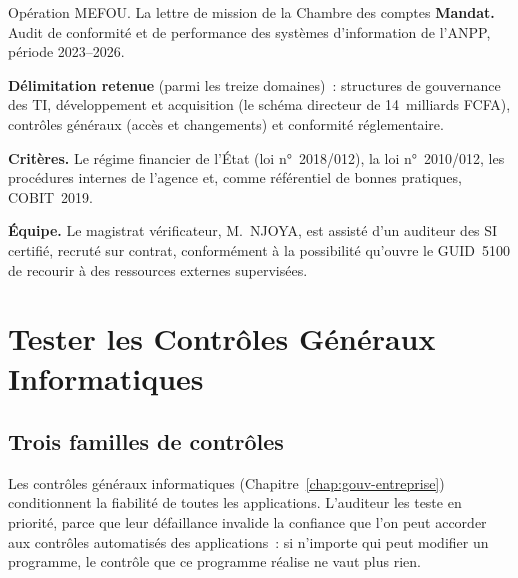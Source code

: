 \begin{boxscenario}{Opération MEFOU. La lettre de mission de la Chambre des comptes}
\textbf{Mandat.} Audit de conformité et de performance des systèmes
d'information de l'ANPP, période 2023--2026.

\medskip
\textbf{Délimitation retenue} (parmi les treize domaines)~: structures de
gouvernance des TI, développement et acquisition (le schéma directeur de
14~milliards FCFA), contrôles généraux (accès et changements) et
conformité réglementaire.

\medskip
\textbf{Critères.} Le régime financier de l'État (loi n°~2018/012), la loi
n°~2010/012, les procédures internes de l'agence et, comme référentiel de
bonnes pratiques, COBIT~2019.

\medskip
\textbf{Équipe.} Le magistrat vérificateur, M.~NJOYA, est assisté d'un
auditeur des SI certifié, recruté sur contrat, conformément à la
possibilité qu'ouvre le GUID~5100 de recourir à des ressources externes
supervisées.
\end{boxscenario}

\section{Tester les Contrôles Généraux Informatiques}
\label{sec:c11-itgc}

\subsection{Trois familles de contrôles}

Les contrôles généraux informatiques (Chapitre~\ref{chap:gouv-entreprise})
conditionnent la fiabilité de toutes les applications. L'auditeur les
teste en priorité, parce que leur défaillance invalide la confiance que
l'on peut accorder aux contrôles automatisés des applications~: si
n'importe qui peut modifier un programme, le contrôle que ce programme
réalise ne vaut plus rien.

